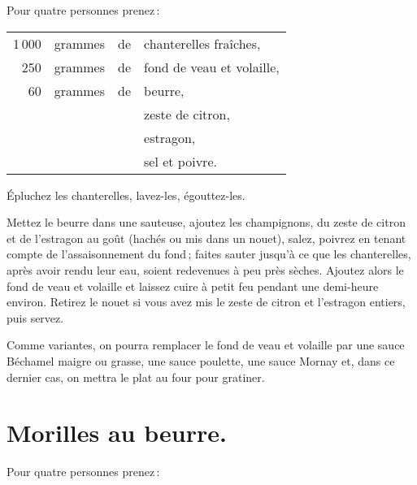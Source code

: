 Pour quatre personnes prenez :

\footnotesize
\begin{longtable}{rrrp{16em}}
  1 000 & grammes & de & chanterelles fraîches,                                                           \\
    250 & grammes & de & fond de veau et volaille,                                                        \\
     60 & grammes & de & beurre,                                                                          \\
        &         &    & zeste de citron,                                                                 \\
        &         &    & estragon,                                                                        \\
        &         &    & sel et poivre.                                                                   \\
\end{longtable}
\normalsize

Épluchez les chanterelles, lavez-les, égouttez-les.

Mettez le beurre dans une sauteuse, ajoutez les champignons, du zeste de citron
et de l’estragon au goût (hachés ou mis dans un nouet), salez, poivrez en
tenant compte de l’assaisonnement du fond ; faites sauter jusqu'à ce que les
chanterelles, après avoir rendu leur eau, soient redevenues à peu près sèches.
Ajoutez alors le fond de veau et volaille et laissez cuire à petit feu pendant
une demi-heure environ. Retirez le nouet si vous avez mis le zeste de citron et
l'estragon entiers, puis servez.

\sk

Comme variantes, on pourra remplacer le fond de veau et volaille par une sauce
Béchamel maigre ou grasse, une sauce poulette, une sauce Mornay et, dans ce
dernier cas, on mettra le plat au four pour gratiner.

\section*{\centering Morilles au beurre.}
{}

Pour quatre personnes prenez :

